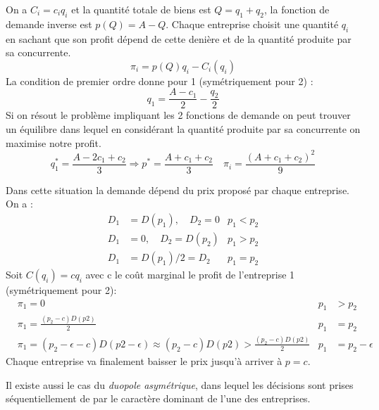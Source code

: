 \begin{tcolorbox}[title=Duopole de Cournot]
	
	On a $C_i=c_iq_i$ et la quantité totale de biens est $Q=q_1+q_2$, la fonction de demande inverse est $p(Q)=A-Q$.
	Chaque entreprise choisit une quantité $q_i$ en sachant que son profit dépend de cette denière et de la quantité produite par sa concurrente.
	\[
		\pi_i = p(Q)q_i-C_i(q_i)
	\]
	La condition de premier ordre donne pour 1 (symétriquement pour 2) :
	\[
		q_1 = \frac{A-c_1}{2}-\frac{q_2}{2}
	\]
	Si on résout le problème impliquant les 2 fonctions de demande on peut trouver un équilibre dans lequel en considérant la quantité produite par sa concurrente on maximise notre profit.
	\[
		q_1^* = \frac{A-2c_1+c_2}{3} \Rightarrow p^* = \frac{A+c_1+c_2}{3} \quad \pi_i= \frac{(A+c_1+c_2)^2}{9}
	\]
	
\end{tcolorbox}

\begin{tcolorbox}[title=Duopole de Bertrand]
	
	Dans cette situation la demande dépend du prix proposé par chaque entreprise. On a : 
	\begin{align*}
		D_1 &= D(p_1), \quad D_2=0  &p_1<p_2 \\
		D_1 &= 0, \quad D_2 = D(p_2)  &p_1>p_2 \\
		D_1 &= D(p_1)/2 = D_2 &p_1=p_2
	\end{align*}
	Soit $C(q_i)=cq_i$ avec c le coût marginal le profit de l'entreprise 1 (symétriquement pour 2):
	\begin{align*}
		&\pi_1=0  &p_1&>p_2 \\
		&\pi_1 = \frac{(p_2-c)D(p2)}{2} &p_1&=p_2 \\
		&\pi_1= (p_2-\epsilon-c)D(p2-\epsilon) \approx (p_2-c)D(p2)> \frac{(p_2-c)D(p2)}{2} &p_1&=p_2-\epsilon
	\end{align*}
	Chaque entreprise va finalement baisser le prix jusqu'à arriver à $p=c$.
	
\end{tcolorbox}

Il existe aussi le cas du \emph{duopole asymétrique}, dans lequel les décisions sont prises séquentiellement de par le caractère dominant de l'une des entreprises.


